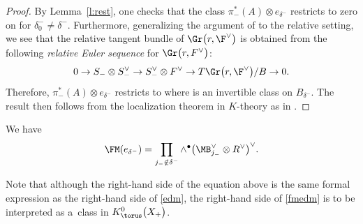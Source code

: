 \begin{proof}
By Lemma~\ref{l:rest}, one checks that the class $\pi_-^*(A) \otimes e_{\delta^-}$ restricts to zero on  for $\delta_0^- \neq \delta^-$. Furthermore, generalizing the argument of \cite[Section~5.1]{CKM14} to the relative setting, we see that the relative tangent bundle of $\Gr\bigl(r, \F^\vee\bigr)$ is obtained from the following \emph{relative Euler sequence} for $\Gr\bigl(r, F^\vee\bigr)$:
\begin{equation}\label{e:Euler} 0 \rightarrow S_{-} \otimes S_{-}^\vee \rightarrow S_{-}^\vee \otimes F^\vee \rightarrow T\Gr\bigl(r, \F^\vee\bigr)/ B \rightarrow 0.\end{equation} Therefore, $\pi_-^*(A) \otimes e_{\delta^-}$ restricts to  where  is an invertible class on $B_{\delta^-}$. The result then follows from the localization theorem in $K$-theory as in \mbox{\cite[Section~2.3]{Oko15}}.
\end{proof}

\begin{Proposition}
We have
\begin{equation}\label{fmedm}
\FM(e_{\delta^-}) = \prod_{j_- \notin \delta^-} \wedge^\bullet \bigl(\MB_{j_-}^\vee \otimes R^\vee\bigr)^\vee.
\end{equation}
\end{Proposition}

\begin{Remark}
 Note that although the right-hand side of the equation above is the same formal expression as the right-hand side of \eqref{edm}, the right-hand side of \eqref{fmedm} is to be interpreted as a~class in $K^0_\torus\bigl(X_+\bigr)$.
\end{Remark}

